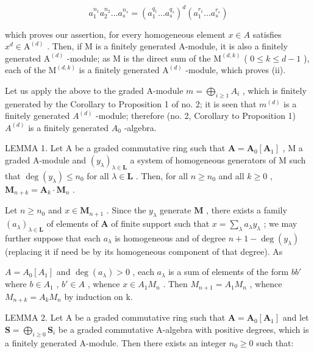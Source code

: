 \[
a _ {1} ^ {n _ {1}} a _ {2} ^ {n _ {2}} \dots a _ {s} ^ {n _ {s}} = (a _ {1} ^ {q _ {1}} \dots a _ {s} ^ {q _ {s}}) ^ {d} (a _ {1} ^ {r _ {1}} \dots a _ {s} ^ {r _ {s}})
\]

which proves our assertion, for every homogeneous element \(x \in A\) satisfies \(x^{d} \in \mathrm{A}^{(d)}\) . Then, if M is a finitely generated A-module, it is also a finitely generated \(\mathrm{A}^{(d)}\) -module; as M is the direct sum of the \(\mathrm{M}^{(d,k)}\) ( \(0 \leqslant k \leqslant d - 1\) ), each of the \(\mathrm{M}^{(d,k)}\) is a finitely generated \(\mathrm{A}^{(d)}\) -module, which proves (ii).

Let us apply the above to the graded A-module \(m = \bigoplus_{i \geqslant 1} A_i\) , which is finitely generated by the Corollary to Proposition 1 of no. 2; it is seen that \(m^{(d)}\) is a finitely generated \(A^{(d)}\) -module; therefore (no. 2, Corollary to Proposition 1) \(A^{(d)}\) is a finitely generated \(A_0\) -algebra.

LEMMA 1. Let A be a graded commutative ring such that \(\mathbf{A} = \mathbf{A}_0[\mathbf{A}_1]\) , M a graded A-module and \((y_{\lambda})_{\lambda \in \mathbf{L}}\) a system of homogeneous generators of M such that \(\deg(y_{\lambda}) \leqslant n_0\) for all \(\lambda \in \mathbf{L}\) . Then, for all \(n \geqslant n_0\) and all \(k \geqslant 0\) , \(\mathbf{M}_{n+k} = \mathbf{A}_k \cdot \mathbf{M}_n\) .

Let \(n \geqslant n_0\) and \(x \in \mathbf{M}_{n+1}\) . Since the \(y_\lambda\) generate \(\mathbf{M}\) , there exists a family \((a_\lambda)_{\lambda \in \mathbf{L}}\) of elements of \(\mathbf{A}\) of finite support such that \(x = \sum_{\lambda} a_\lambda y_\lambda\) ; we may further suppose that each \(a_\lambda\) is homogeneous and of degree \(n + 1 - \deg(y_\lambda)\) (replacing it if need be by its homogeneous component of that degree). As

\(A = A_{0}[A_{1}]\) and \(\deg(a_{\lambda}) > 0\) , each \(a_{\lambda}\) is a sum of elements of the form \(bb'\) where \(b \in A_{1}\) , \(b' \in A\) , whence \(x \in A_{1}M_{n}\) . Then \(M_{n+1} = A_{1}M_{n}\) , whence \(M_{n+k} = A_{k}M_{n}\) by induction on k.

LEMMA 2. Let A be a graded commutative ring such that \(\mathbf{A} = \mathbf{A}_0[\mathbf{A}_1]\) and let \(\mathbf{S} = \bigoplus_{i\geqslant 0}\mathbf{S}_i\) be a graded commutative A-algebra with positive degrees, which is a finitely generated A-module. Then there exists an integer \(n_0\geqslant 0\) such that:

